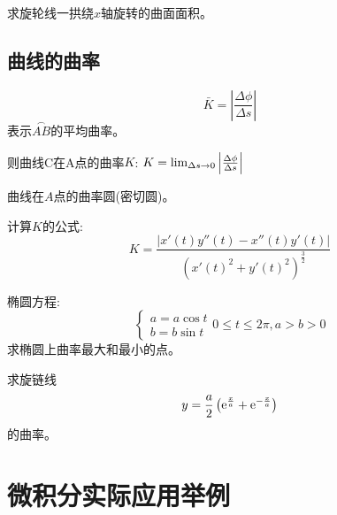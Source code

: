 \begin{example}
    求旋轮线一拱绕$x$轴旋转的曲面面积。
\end{example}
\begin{solution}
    
\end{solution}

\subsection{曲线的曲率}
\begin{equation*}
    \bar{K} = \left| \frac{\Delta \phi}{\Delta s} \right|
\end{equation*}
表示$\overset{\frown}{AB}$的平均曲率。

则曲线C在A点的曲率$K$: $K = \lim_{\Delta s \to 0 } \left|\frac{\Delta \phi}{\Delta s} \right|$

曲线在$A$点的曲率圆(密切圆)。

计算$K$的公式:
\begin{equation*}
    K = \frac{|x'(t)y''(t)-x''(t)y'(t)|}{(x'(t)^2+y'(t)^2)^{\frac{3}{2}}}
\end{equation*}

\begin{example}
    椭圆方程:
    \begin{equation*}
        \begin{cases}
            a = a\cos t \\
            b = b \sin t
        \end{cases}
        0 \le t \le 2\pi, a > b > 0
    \end{equation*}
    求椭圆上曲率最大和最小的点。
\end{example}
\begin{solution}
    
\end{solution}

\begin{example}
    求旋链线
    \begin{equation*}
        y = \frac{a}{2}\left( \mathrm{e}^{\frac{x}{a}} + \mathrm{e}^{-\frac{x}{a}}\right)
    \end{equation*}
    的曲率。
\end{example}
\begin{solution}
    
\end{solution}

\section{微积分实际应用举例}
